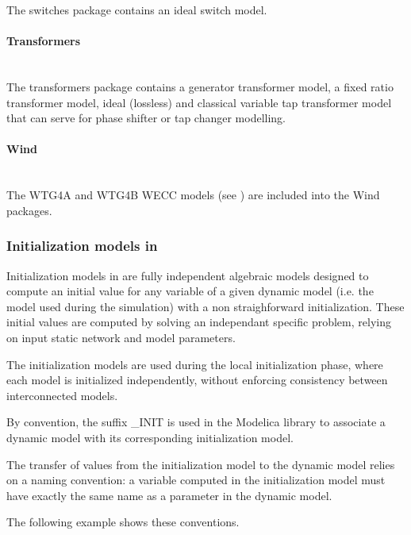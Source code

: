 \documentclass[a4paper, 12pt]{report}
\begin{document}
The switches package contains an ideal switch model.

\paragraph{Transformers}
~~\\

The transformers package contains a generator transformer model, a fixed ratio transformer model, ideal (lossless) and classical variable tap transformer model that can serve for phase shifter or tap changer modelling.

\paragraph{Wind}
~~\\

The WTG4A and WTG4B \ac{WECC} models (see \cite{WECC}) are included into the Wind packages.

\subsubsection[Initialization models in Dynawo]{Initialization models in \Dynawo}

Initialization models in \Dynawo are fully independent algebraic models designed to compute an initial value
for any variable of a given dynamic model (i.e. the model used during the simulation) with a non straighforward initialization.
These initial values are computed by solving an independant specific problem, relying on input static network and model parameters.

The initialization models are used during the local initialization phase, where each model is initialized independently,
without enforcing consistency between interconnected models.

By convention, the suffix \_INIT is used in the Modelica library to associate a dynamic model with its corresponding initialization model.

The transfer of values from the initialization model to the dynamic model relies on a naming convention:
a variable computed in the initialization model must have exactly the same name as a parameter in the dynamic model.

The following example shows these conventions.



\end{document}
